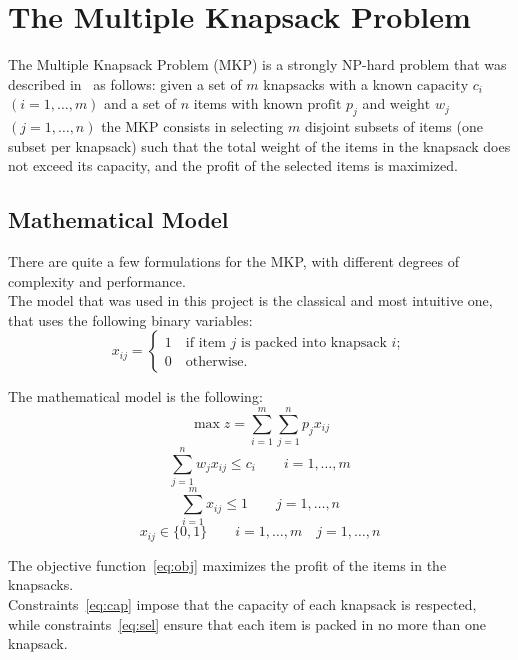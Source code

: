 \chapter{The Multiple Knapsack Problem}\label{ch:mkp}
The Multiple Knapsack Problem (MKP) is a strongly NP-hard problem
that was described in~\cite{mkp:2019} as follows:
given a set of \(m\) knapsacks with a known \(\text{capacity } c_{i}\)
\((i=1,\dots,m)\) and a set of \(n\) items with
known \(\text{profit } p_{j}\) and \(\text{weight } w_{j}\) \((j=1,\dots,n)\)
the MKP consists in selecting \(m\) disjoint subsets of items
(one subset per knapsack) such that the total weight of the items in the knapsack
does not exceed its capacity, and the profit of the selected items is maximized.


\section{Mathematical Model}\label{sec:model}
There are quite a few formulations for the MKP, with different degrees of
complexity and performance.\\
The model that was used in this project is the classical and most intuitive
one, that uses the following binary variables:
\[x_{ij}=
\begin{cases*}
    1 \quad \text{if item } j \text{ is packed into knapsack } i;\\
    0 \quad \text{otherwise}.
\end{cases*}
\]

The mathematical model is the following:
\begin{equation}
    \label{eq:obj}
    \max{z} = \sum_{i=1}^{m} \sum_{j=1}^{n} p_{j} x_{ij}
\end{equation}
\begin{equation}
    \label{eq:cap}
    \sum_{j=1}^{n} w_{j} x_{ij} \leq c_{i} \qquad i=1,\dots,m
\end{equation}
\begin{equation}
    \label{eq:sel}
    \sum_{i=1}^{m} x_{ij} \leq 1 \qquad j=1,\dots,n
\end{equation}
\begin{equation}
    x_{ij} \in \{0,1\} \qquad i=1,\dots,m \quad j=1,\dots,n
\end{equation}

The objective function~\eqref{eq:obj} maximizes the profit
of the items in the knapsacks.\\
Constraints~\eqref{eq:cap} impose that the capacity of each knapsack is respected,
while constraints~\eqref{eq:sel} ensure that each item
is packed in no more than one knapsack.

